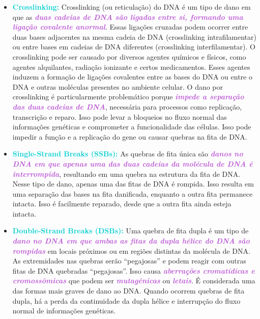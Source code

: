 \documentclass[11pt,a4paper]{article}
\begin{document}
\begin{itemize}[label=\textcolor{CarnationPink}{$\blacktriangleright$}]
    \item \textcolor{DarkTurquoise}{\textbf{Crosslinking:}} Crosslinking (ou reticulação) do DNA é um tipo de dano em que as \textcolor{MediumOrchid}{\textbf{\textit{duas cadeias de DNA são ligadas entre si, formando uma ligação covalente anormal}}}. Essas ligações cruzadas podem ocorrer entre duas bases adjacentes na mesma cadeia de DNA (crosslinking intrafilamentar) ou entre bases em cadeias de DNA diferentes (crosslinking interfilamentar). O crosslinking pode ser causado por diversos agentes químicos e físicos, como agentes alquilantes, radiação ionizante e certos medicamentos. Esses agentes induzem a formação de ligações covalentes entre as bases do DNA ou entre o DNA e outras moléculas presentes no ambiente celular. O dano por crosslinking é particularmente problemático porque \textcolor{MediumOrchid}{\textbf{\textit{impede a separação das duas cadeias de DNA}}}, necessária para processos como replicação, transcrição e reparo. Isso pode levar a bloqueios no fluxo normal das informações genéticas e comprometer a funcionalidade das células. Isso pode impedir a função e a replicação do gene ou causar quebras na fita de DNA.
    
    \item \textcolor{DarkTurquoise}{\textbf{Single-Strand Breaks (SSBs):}} As quebras de fita única são \textcolor{MediumOrchid}{\textbf{\textit{danos no DNA em que apenas uma das duas cadeias da molécula de DNA é interrompida}}}, resultando em uma quebra na estrutura da fita de DNA. Nesse tipo de dano, apenas uma das fitas de DNA é rompida. Isso resulta em uma separação das bases na fita danificada, enquanto a outra fita permanece intacta. Isso é facilmente reparado, desde que a outra fita ainda esteja intacta.
    
    \item \textcolor{DarkTurquoise}{\textbf{Double-Strand Breaks (DSBs):}} Uma quebra de fita dupla é um tipo de \textcolor{MediumOrchid}{\textbf{\textit{dano no DNA em que ambas as fitas da dupla hélice do DNA são rompidas}}} em locais próximos ou em regiões distintas da molécula de DNA. As extremidades nas quebras serão “pegajosas” e podem reagir com outras fitas de DNA quebradas “pegajosas”. Isso causa \textcolor{MediumOrchid}{\textbf{\textit{aberrações cromatídicas e cromossômicas}}} que podem ser \textcolor{MediumOrchid}{\textbf{\textit{mutagênicas}}} ou \textcolor{MediumOrchid}{\textbf{\textit{letais}}}. É considerada uma das formas mais graves de dano ao DNA. Quando ocorrem quebras de fita dupla, há a perda da continuidade da dupla hélice e interrupção do fluxo normal de informações genéticas.
	\end{itemize}
\end{document}
